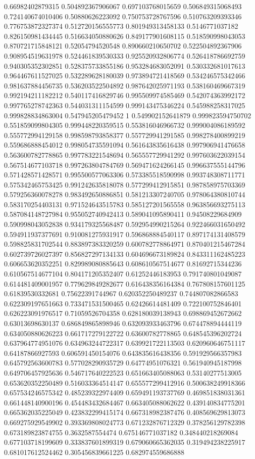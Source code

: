 \begin{table}
\begin{tabu}
\begin{sparkline}{10}
0.66982402879315 0.504892367906067 0.697103768015659 0.506849315068493 0.724140674010406 0.50880626223092 0.750753728767596 0.510763209393346 0.776753872327374 0.512720156555773 0.801949313458133 0.5146771037182 0.826150981434445 0.516634050880626 0.849177901608115 0.518590998043053 0.870721715848121 0.52054794520548 0.890660210650702 0.522504892367906 0.908954519631978 0.524461839530333 0.925520932806774 0.526418786692759 0.940305352302851 0.528375733855186 0.953284683052091 0.530332681017613 0.964467611527025 0.532289628180039 0.973894721418569 0.534246575342466 0.981637884456735 0.536203522504892 0.987642025971193 0.538160469667319 0.992194211182212 0.540117416829746 0.995509974585469 0.542074363992172 0.997765278742363 0.544031311154599 0.999143475346224 0.545988258317025 0.999828834863004 0.547945205479452 1 0.549902152641879 0.999823594750702 0.551859099804305 0.999448220359515 0.553816046966732 0.999004086189592 0.555772994129158 0.998598793858377 0.557729941291585 0.998278400899219 0.559686888454012 0.998054735591094 0.561643835616438 0.997906941476658 0.563600782778865 0.997783221548694 0.565557729941292 0.997603622039154 0.567514677103718 0.997263804784769 0.569471624266145 0.996637555144796 0.571428571428571 0.995500577063306 0.573385518590998 0.993748308711771 0.575342465753425 0.991242635818078 0.577299412915851 0.987858975703369 0.579256360078278 0.983492650886851 0.581213307240705 0.978064380810744 0.583170254403131 0.971524643515783 0.585127201565558 0.963856693275113 0.587084148727984 0.955052740942413 0.589041095890411 0.94508229684909 0.590998043052838 0.934179325568487 0.592954990215264 0.922466031650492 0.594911937377691 0.910081275931917 0.596868884540117 0.897174131408579 0.598825831702544 0.883897383320259 0.600782778864971 0.870401215467284 0.602739726027397 0.856827297134133 0.604696673189824 0.843311162485223 0.606653620352251 0.829989080885643 0.608610567514677 0.81692715344236 0.610567514677104 0.804171205352407 0.61252446183953 0.791740801049087 0.614481409001957 0.779629849282677 0.616438356164384 0.767808157601125 0.61839530332681 0.75622391744967 0.620352250489237 0.744807082866583 0.622309197651663 0.733471531500465 0.62426614481409 0.722100752846401 0.626223091976517 0.71059526704358 0.628180039138943 0.698869452672662 0.63013698630137 0.686849865898946 0.632093933463796 0.674478894444119 0.634050880626223 0.661717279122722 0.63600782778865 0.648545396202724 0.637964774951076 0.634963244722317 0.639921722113503 0.620960646751117 0.64187866927593 0.606591450154076 0.643835616438356 0.591929566357983 0.645792563600783 0.577028290935729 0.64774951076321 0.561940945187998 0.649706457925636 0.546717640222523 0.651663405088063 0.53140277513005 0.653620352250489 0.516033364514147 0.655577299412916 0.500638249918366 0.657534246575342 0.485239322974409 0.659491193737769 0.469851838031361 0.661448140900196 0.454483432684467 0.663405088062622 0.439140834775201 0.665362035225049 0.423832299415174 0.667318982387476 0.408569629813073 0.669275929549902 0.393369808024773 0.671232876712329 0.378256129782398 0.673189823874755 0.3632587554474 0.675146771037182 0.348440218269084 0.677103718199609 0.333837601899319 0.679060665362035 0.319494238225917 0.681017612524462 0.305456839661225 0.682974559686888 
\end{sparkline}
\end{tabu}
\end{table}
